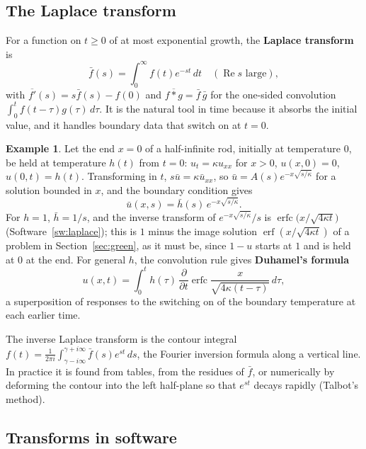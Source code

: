 \documentclass[11pt,a4paper]{article}
\numberwithin{equation}{section}
\theoremstyle{definition}
\newtheorem{exa}[thm]{Example}
\begin{document}
\subsection{The Laplace transform}
\label{ssec:laplacetransform}

For a function on $t \geq 0$ of at most exponential growth, the \textbf{Laplace transform} is
\[
\bar f(s) = \int_0^\infty f(t)e^{-st}\,dt \quad (\operatorname{Re}s \text{ large}) ,
\]
with $\overline{f'}(s) = s\bar f(s) - f(0)$ and $\overline{f * g} = \bar f\,\bar g$ for the one-sided convolution $\int_0^tf(t - \tau)g(\tau)\,d\tau$. It is the natural tool in time because it absorbs the initial value, and it handles boundary data that switch on at $t = 0$.

\begin{exa}
\label{ex:laplaceheat}
Let the end $x = 0$ of a half-infinite rod, initially at temperature $0$, be held at temperature $h(t)$ from $t = 0$: $u_t = \kappa u_{xx}$ for $x > 0$, $u(x, 0) = 0$, $u(0, t) = h(t)$. Transforming in $t$, $s\bar u = \kappa\bar u_{xx}$, so $\bar u = A(s)e^{-x\sqrt{s/\kappa}}$ for a solution bounded in $x$,
and the boundary condition gives
\[
\bar u(x, s) = \bar h(s)\,e^{-x\sqrt{s/\kappa}} .
\]
For $h = 1$, $\bar h = 1/s$, and the inverse transform of $e^{-x\sqrt{s/\kappa}}/s$ is $\operatorname{erfc}\bigl(x/\sqrt{4\kappa t}\bigr)$ (Software~\ref{sw:laplace}); this is $1$ minus the image solution $\operatorname{erf}(x/\sqrt{4\kappa t})$ of a problem in Section~\ref{sec:green}, as it must be, since $1 - u$ starts at $1$ and is held at $0$ at the end. For general $h$, the convolution rule gives \textbf{Duhamel's formula}
\[
u(x, t) = \int_0^th(\tau)\,\frac{\partial}{\partial t}\operatorname{erfc}\frac{x}{\sqrt{4\kappa(t - \tau)}}\,d\tau ,
\]
a superposition of responses to the switching on of the boundary temperature at each earlier time.
\end{exa}

The inverse Laplace transform is the contour integral $f(t) = \frac1{2\pi i}\int_{\gamma - i\infty}^{\gamma + i\infty}\bar f(s)e^{st}\,ds$, the Fourier inversion formula along a vertical line. In practice it is found from tables, from the residues of $\bar f$, or numerically by deforming the contour into the left half-plane so that $e^{st}$ decays
rapidly (Talbot's method).

\subsection{Transforms in software}
\label{ssec:software10}
\end{document}
